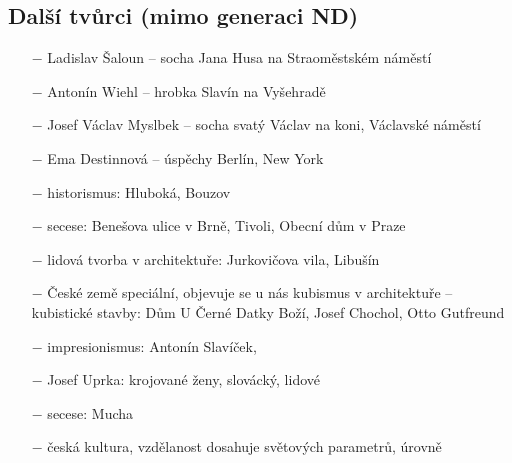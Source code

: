 \documentclass{article}
\begin{document}
\subsection*{Další tvůrci (mimo generaci ND)}
\begin{itemize}
    \vspace{-0.5em}
    \setlength\itemsep{0.15em}
    \item[$-$] Ladislav Šaloun -- socha Jana Husa na Straoměstském náměstí
    \item[$-$] Antonín Wiehl -- hrobka Slavín na Vyšehradě
    \item[$-$] Josef Václav Myslbek -- socha svatý Václav na koni, Václavské náměstí
    \item[$-$] Ema Destinnová -- úspěchy Berlín, New York
    \item[$-$] historismus: Hluboká, Bouzov
    \item[$-$] secese: Benešova ulice v Brně, Tivoli, Obecní dům v Praze
    \item[$-$] lidová tvorba v architektuře: Jurkovičova vila, Libušín
    \item[$-$] České země speciální, objevuje se u nás kubismus v architektuře -- kubistické stavby: Dům U Černé Datky Boží, Josef Chochol, Otto Gutfreund
    \item[$-$] impresionismus: Antonín Slavíček,
    \item[$-$] Josef Uprka: krojované ženy, slovácký, lidové
    \item[$-$] secese: Mucha
    \item[$-$] česká kultura, vzdělanost dosahuje světových parametrů, úrovně
\end{itemize}
\end{document}
